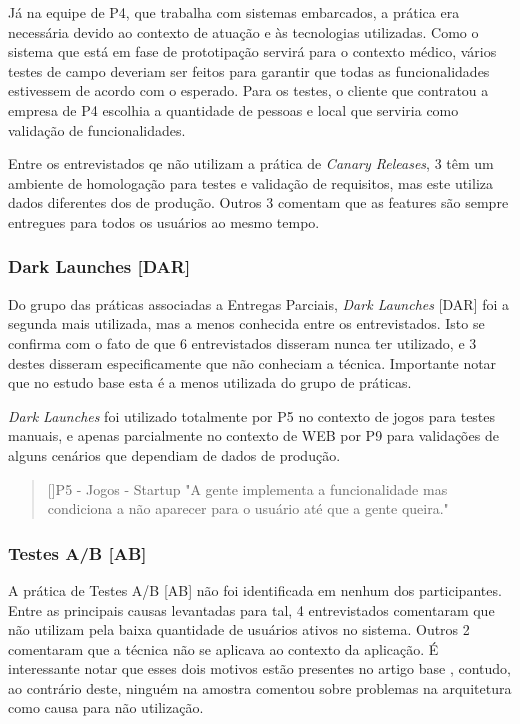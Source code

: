 Já na equipe de P4, que trabalha com sistemas embarcados, a prática era necessária devido ao contexto de atuação e às tecnologias utilizadas. Como o sistema que está em fase de prototipação servirá para o contexto médico, vários testes de campo deveriam ser feitos para garantir que todas as funcionalidades estivessem de acordo com o esperado. Para os testes, o cliente que contratou a empresa de P4 escolhia a quantidade de pessoas e local que serviria como validação de funcionalidades.

Entre os entrevistados qe não utilizam a prática de \emph{Canary Releases}, 3 têm um ambiente de homologação para testes e validação de requisitos, mas este utiliza dados diferentes dos de produção. Outros 3 comentam que as features são sempre entregues para todos os usuários ao mesmo tempo.


\subsubsection{Dark Launches [DAR]}

Do grupo das práticas associadas a Entregas Parciais, \emph{Dark Launches} [DAR] foi a segunda mais utilizada, mas a menos conhecida entre os entrevistados. Isto se confirma com o fato de que 6 entrevistados disseram nunca ter utilizado, e 3 destes disseram especificamente que não conheciam a técnica. Importante notar que no estudo base \cite{empiricalStudy2016} esta é a menos utilizada do grupo de práticas.

\emph{Dark Launches} foi utilizado totalmente por P5 no contexto de jogos para testes manuais, e apenas parcialmente no contexto de WEB por P9 para validações de alguns cenários que dependiam de dados de produção.


\begin{quotation}[]{P5 - Jogos - Startup}
    "A gente implementa a funcionalidade mas condiciona a não aparecer para o usuário até que a gente queira."
\end{quotation}

\subsubsection{Testes A/B [AB]}

A prática de Testes A/B [AB] não foi identificada em nenhum dos participantes. Entre as principais causas levantadas para tal, 4 entrevistados comentaram que não utilizam pela baixa quantidade de usuários ativos no sistema. Outros 2 comentaram que a técnica não se aplicava ao contexto da aplicação. É interessante notar que esses dois motivos estão presentes no artigo base \cite{empiricalStudy2016}, contudo, ao contrário deste, ninguém na amostra comentou sobre problemas na arquitetura como causa para não utilização.


